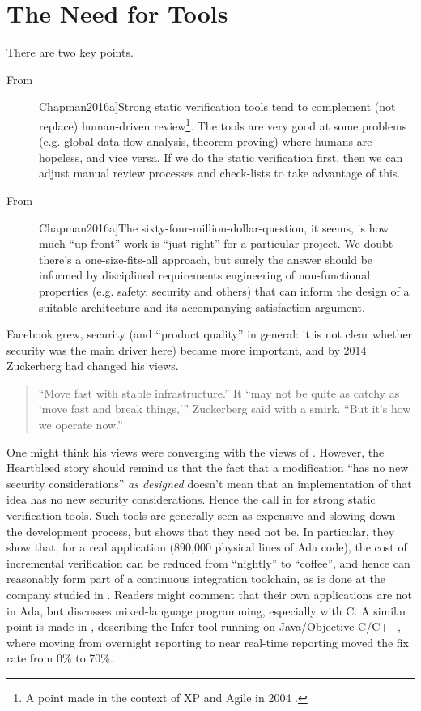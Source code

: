 \documentclass{llncs}
\begin{document}
\section{The Need for Tools}
\def\foo{\cite[\S 4.1]{Chapman2016a}}
\def\bar{\cite[\S 6]{Chapman2016a}}
There are two key points.
\begin{description}
\item[From \foo]Strong static verification tools tend to complement (not replace) human-driven review\footnote{A point made in the context of XP and Agile in 2004 \cite{Wayrynenetal2004}.}. The tools are very good at some problems (e.g. global data flow analysis, theorem proving) where humans are hopeless, and vice versa. If we do the static verification first, then we can adjust manual review processes and check-lists to take advantage of this.
\item[From \bar]The sixty-four-million-dollar-question, it seems, is how much ``up-front'' work is ``just right'' for a particular project. We doubt there's a one-size-fits-all approach, but surely the answer should be informed by disciplined requirements engineering of non-functional properties (e.g. safety, security and others) that can inform the design of a suitable architecture and its accompanying satisfaction argument.
\end{description}
\par\noindent
Facebook grew, security (and ``product quality'' in general: it is not clear whether security was the main driver here) became more important, and by 2014 Zuckerberg had changed his views.
\begin{quote}
``Move fast with stable infrastructure.'' It ``may not be quite as catchy as `move fast and break things,''' Zuckerberg said with a smirk. ``But it's how we operate now.'' \cite{Statt2014a}
\end{quote}
\par\noindent
One might think his views were converging with the views of  \cite{Chapman2016a}. However, the Heartbleed story should remind us that the fact that a modification ``has no new security considerations''  \emph{as designed}  \cite{Seggelmannetal2012a} doesn't mean that an implementation of that idea has no new security considerations. Hence the call in \foo{} for strong static verification tools. Such tools are generally seen as expensive and slowing down the development process, but \cite{BrainSchanda2012a} shows that they need not be. In particular, they show that, for a real application (890,000 physical lines of Ada code), the cost of incremental verification can be reduced from ``nightly'' to ``coffee'', and hence can reasonably form part of a continuous integration toolchain, as is done at the company studied in \cite{BrainSchanda2012a}. Readers might  comment that their own applications are not in Ada, but \cite[\S5.6]{ChapmanMoy2018a} discusses mixed-language programming, especially with C.  A similar point is made in \cite{Distefanoetal2019a}, describing the Infer tool running on Java/Objective C/C++, where moving from overnight reporting to near real-time reporting moved the fix rate from 0\% to 70\%.
\end{document}
